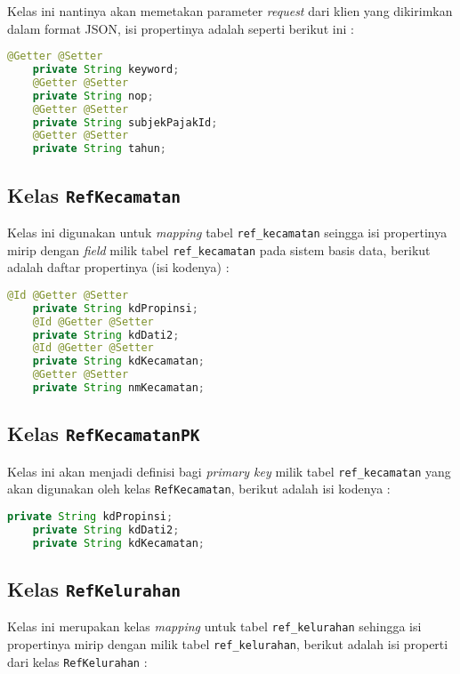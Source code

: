 \documentclass[pdftex,12pt, oneside]{article}
\begin{document}
Kelas ini nantinya akan memetakan parameter \textit{request} dari klien yang dikirimkan dalam format JSON, isi propertinya adalah seperti berikut ini :

\begin{lstlisting}[language=java]
    @Getter @Setter
    private String keyword;
    @Getter @Setter
    private String nop;
    @Getter @Setter
    private String subjekPajakId;
    @Getter @Setter
    private String tahun;
\end{lstlisting}

\subsection{Kelas \texttt{RefKecamatan}}

Kelas ini digunakan untuk \textit{mapping} tabel \texttt{ref\_kecamatan} seingga isi propertinya mirip dengan \textit{field} milik tabel \texttt{ref\_kecamatan} pada sistem basis data, berikut adalah daftar propertinya (isi kodenya) :

\begin{lstlisting}[language=java]
    @Id @Getter @Setter
    private String kdPropinsi;
    @Id @Getter @Setter
    private String kdDati2;
    @Id @Getter @Setter
    private String kdKecamatan;
    @Getter @Setter
    private String nmKecamatan;
\end{lstlisting}

\subsection{Kelas \texttt{RefKecamatanPK}}

Kelas ini akan menjadi definisi bagi \textit{primary key} milik tabel \texttt{ref\_kecamatan} yang akan digunakan oleh kelas \texttt{RefKecamatan}, berikut adalah isi kodenya :

\begin{lstlisting}[language=java]
    private String kdPropinsi;
    private String kdDati2;
    private String kdKecamatan;
\end{lstlisting}

\subsection{Kelas \texttt{RefKelurahan}}

Kelas ini merupakan kelas \textit{mapping} untuk tabel \texttt{ref\_kelurahan} sehingga isi propertinya mirip dengan milik tabel \texttt{ref\_kelurahan}, berikut adalah isi properti dari kelas \texttt{RefKelurahan} :
\end{document}
